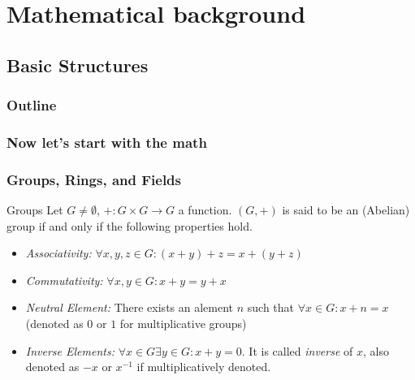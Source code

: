 \documentclass{beamer}
\begin{document}
\section{Mathematical background}
\subsection{Basic Structures}
\begin{frame}
\frametitle{Outline}
\tableofcontents
\end{frame}

\begin{frame}
\frametitle{Now let's start with the math}
       \begin{figure}
       \end{figure}
\end{frame}



\begin{frame}
\frametitle{Groups, Rings, and Fields}
\begin{block}{Groups}
Let $G\neq\emptyset$, $+:G\times G\to G$ a function. $(G,+)$ is said to be an (Abelian) group if and only if the following properties hold.\pause
\begin{itemize}
\item \textit{Associativity:} $\forall x,y,z\in G: (x+y)+z = x + (y+z)$\pause
\item \textit{Commutativity:} $\forall x,y\in G: x+y=y+x$\pause
\item \textit{Neutral Element:} There exists an alement $n$ such that $\forall x\in G: x+n=x$ (denoted as $0$ or $1$ for multiplicative groups)\pause
\item \textit{Inverse Elements:} $\forall x\in G\exists y\in G: x+y=0$. It is called \textit{inverse} of $x$, also denoted as $-x$ or $x^{-1}$ if multiplicatively denoted.
\end{itemize}
\end{block}

\end{frame}
\end{document}
